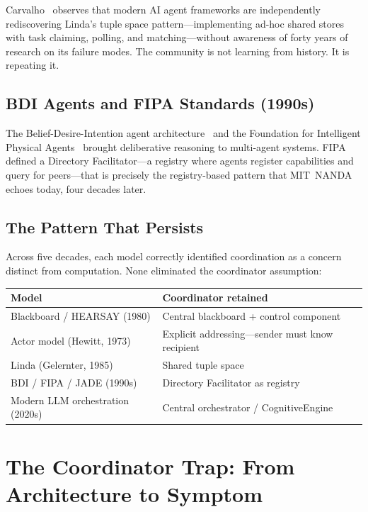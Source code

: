 \documentclass[11pt]{article}
\begin{document}
Carvalho~\cite{carvalho} observes that modern AI agent frameworks are
independently rediscovering Linda's tuple space pattern---implementing ad-hoc
shared stores with task claiming, polling, and matching---without awareness of
forty years of research on its failure modes. The community is not learning from
history. It is repeating it.

\subsection{BDI Agents and FIPA Standards (1990s)}

The Belief-Desire-Intention agent architecture~\cite{bdi} and the Foundation for
Intelligent Physical Agents~\cite{fipa,jade} brought deliberative reasoning to
multi-agent systems. FIPA defined a Directory Facilitator---a registry where
agents register capabilities and query for peers---that is precisely the
registry-based pattern that MIT~NANDA echoes today, four decades later.

\subsection{The Pattern That Persists}

Across five decades, each model correctly identified coordination as a concern
distinct from computation. None eliminated the coordinator assumption:

\begin{center}
\begin{tabular}{ll}
\toprule
\textbf{Model} & \textbf{Coordinator retained} \\
\midrule
Blackboard / HEARSAY (1980) & Central blackboard + control component \\
Actor model (Hewitt, 1973) & Explicit addressing---sender must know recipient \\
Linda (Gelernter, 1985) & Shared tuple space \\
BDI / FIPA / JADE (1990s) & Directory Facilitator as registry \\
Modern LLM orchestration (2020s) & Central orchestrator / CognitiveEngine \\
\bottomrule
\end{tabular}
\end{center}

\section{The Coordinator Trap: From Architecture to Symptom}
\label{sec:trap}
\end{document}
